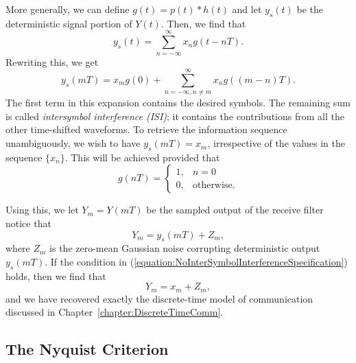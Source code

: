 More generally, we can define $g(t) = p(t) * h(t)$ and let $y_s (t)$ be the deterministic signal portion of $Y(t)$.
Then, we find that
\[ y_s (t) = \sum_{n = -\infty}^{\infty} x_n g(t - nT). \]
Rewriting this, we get
\begin{equation*}
y_s (mT) = x_m g(0) + \sum_{n=-\infty,n \neq m}^{\infty} x_n g\left( (m - n)T \right) .
\end{equation*}
The first term in this expansion contains the desired symbols.
The remaining sum is called \emph{intersymbol interference (ISI)}; it contains the contributions from all the other time-shifted waveforms.
To retrieve the information sequence unambiguously, we wish to have $y_s (mT) = x_m$, irrespective of the values in the sequence $\{ x_n \}$.
This will be achieved provided that
\begin{equation} \label{equation:NoInterSymbolInterferenceSpecification}
g(nT) = \begin{cases} 1, & n = 0 \\
0, & \text{otherwise} . \end{cases}
\end{equation}

\iffalse
The random portion $r_n (t)$ of the received waveform is defined by
\[ r_n (t) = \int_{-\infty}^{\infty} N(t-\tau) h_r (\tau) d \tau. \]
\fi

Using this, we let $Y_m = Y(mT)$ be the sampled output of the receive filter notice that
\[ Y_m = y_s (mT) + Z_m, \]
where $Z_m$ is the zero-mean Gaussian noise corrupting deterministic output $y_s (mT)$.
If the condition in (\ref{equation:NoInterSymbolInterferenceSpecification}) holds, then we find that
\[ Y_m = x_m + Z_m, \]
and we have recovered exactly the discrete-time model of communication discussed in Chapter~\ref{chapter:DiscreteTimeComm}.

\subsection{The Nyquist Criterion}

